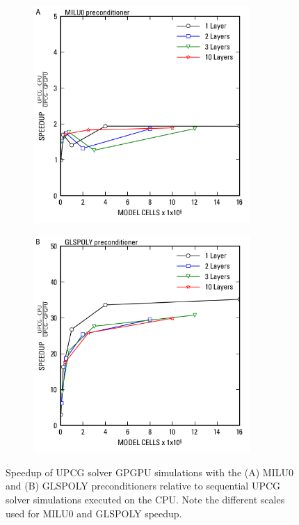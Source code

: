 \documentclass[12pt]{article}
\begin{document}
\newpage
\begin{figure}[hp]
	\begin{subfigure}[b]{0.5\textwidth}
		\centering
  		\includegraphics[width=8.25cm]{Figure3a.png}
	\end{subfigure}
	\begin{subfigure}[b]{0.5\textwidth}
		\centering
  		\includegraphics[width=8.25cm]{Figure3b.png}
	\end{subfigure}
 	\caption{Speedup of UPCG solver GPGPU simulations with the (A) MILU0 and (B) GLSPOLY preconditioners relative to sequential UPCG solver simulations executed on the CPU. Note the different scales used for MILU0 and GLSPOLY speedup.}
	\label{FigCPUGPUResults}
\end{figure}
\end{document}
